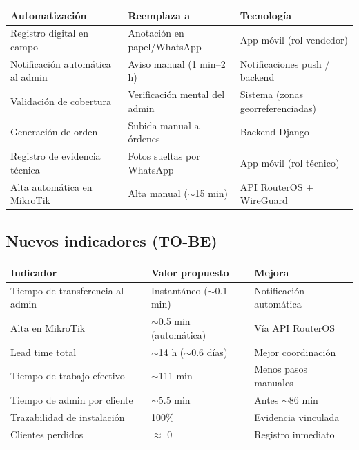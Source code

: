 \begin{center}
\label{tab:automatizaciones}
\begin{tabularx}{\textwidth}{L{3.8cm} X L{3.8cm}}
\toprule
\textbf{Automatización} & \textbf{Reemplaza a} & \textbf{Tecnología} \\
\midrule
Registro digital en campo & Anotación en papel/WhatsApp & App móvil (rol vendedor) \\
Notificación automática al admin & Aviso manual (1 min--2 h) & Notificaciones push / backend \\
Validación de cobertura & Verificación mental del admin & Sistema (zonas georreferenciadas) \\
Generación de orden & Subida manual a órdenes & Backend Django \\
Registro de evidencia técnica & Fotos sueltas por WhatsApp & App móvil (rol técnico) \\
Alta automática en MikroTik & Alta manual ($\sim$15 min) & API RouterOS $+$ WireGuard \\
\bottomrule
\end{tabularx}
\end{center}

\subsection{Nuevos indicadores (TO-BE)}

\begin{center}
\label{tab:ind-tobe}
\begin{tabularx}{\textwidth}{L{4.3cm} L{3.2cm} X}
\toprule
\textbf{Indicador} & \textbf{Valor propuesto} & \textbf{Mejora} \\
\midrule
Tiempo de transferencia al admin & Instantáneo ($\sim$0.1 min) & Notificación automática \\
Alta en MikroTik & $\sim$0.5 min (automática) & Vía API RouterOS \\
Lead time total & $\sim$14 h ($\sim$0.6 días) & Mejor coordinación \\
Tiempo de trabajo efectivo & $\sim$111 min & Menos pasos manuales \\
Tiempo de admin por cliente & $\sim$5.5 min & Antes $\sim$86 min \\
Trazabilidad de instalación & 100\% & Evidencia vinculada \\
Clientes perdidos & $\approx$ 0 & Registro inmediato \\
\bottomrule
\end{tabularx}
\end{center}

